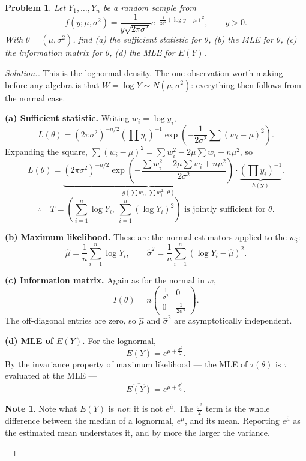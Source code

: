 \documentclass[12pt,a4paper]{report}
\theoremstyle{definition}
\newtheorem{note}[thm]{Note}
\theoremstyle{plain}
\newtheorem{problemx}{Problem}[section]
\newenvironment{problem}{\begin{problemx}}{\end{problemx}}
\newenvironment{solution}
  {\renewcommand{\qedsymbol}{}\begin{proof}[\textit{Solution}.]}
  {\end{proof}}
\begin{document}
\begin{problem}
Let $Y_1,\ldots,Y_n$ be a random sample from
\[f(y;\mu,\sigma^2)=\frac{1}{y\sqrt{2\pi\sigma^2}}
e^{-\frac{1}{2\sigma^2}(\log y-\mu)^2},\qquad y>0.\]
With $\theta=(\mu,\sigma^2)$, find (a) the sufficient statistic for $\theta$, (b) the
MLE for $\theta$, (c) the information matrix for $\theta$, (d) the MLE for $E(Y)$.
\end{problem}

\begin{solution}
This is the lognormal density. The one observation worth making before any algebra
is that $W=\log Y\sim N(\mu,\sigma^2)$: everything then follows from the normal case.

\textbf{(a) Sufficient statistic.} Writing $w_i=\log y_i$,
\[L(\theta)=\left(2\pi\sigma^2\right)^{-n/2}\left(\prod y_i\right)^{-1}
\exp\!\left(-\frac{1}{2\sigma^2}\sum(w_i-\mu)^2\right).\]
Expanding the square, $\sum(w_i-\mu)^2=\sum w_i^2-2\mu\sum w_i+n\mu^2$, so
\[L(\theta)=\underbrace{\left(2\pi\sigma^2\right)^{-n/2}
\exp\!\left(-\frac{\sum w_i^2-2\mu\sum w_i+n\mu^2}{2\sigma^2}\right)}
_{g\left(\sum w_i,\ \sum w_i^2;\ \theta\right)}
\cdot\underbrace{\left(\prod y_i\right)^{-1}}_{h(\mathbf{y})}.\]
\[\therefore\quad T=\left(\sum_{i=1}^n\log Y_i,\ \sum_{i=1}^n(\log Y_i)^2\right)
\text{ is jointly sufficient for }\theta.\]

\textbf{(b) Maximum likelihood.} These are the normal estimators applied to the
$w_i$:
\[\hat\mu=\frac{1}{n}\sum_{i=1}^n\log Y_i,\qquad
\hat\sigma^2=\frac{1}{n}\sum_{i=1}^n\left(\log Y_i-\hat\mu\right)^2.\]

\textbf{(c) Information matrix.} Again as for the normal in $w$,
\[I(\theta)=n\begin{pmatrix}\frac{1}{\sigma^2} & 0\\[3pt]
0 & \frac{1}{2\sigma^4}\end{pmatrix}.\]
The off-diagonal entries are zero, so $\hat\mu$ and $\hat\sigma^2$ are
asymptotically independent.

\textbf{(d) MLE of $E(Y)$.} For the lognormal,
\[E(Y)=e^{\mu+\frac{\sigma^2}{2}}.\]
By the invariance property of maximum likelihood --- the MLE of $\tau(\theta)$ is
$\tau$ evaluated at the MLE ---
\[\widehat{E(Y)}=e^{\hat\mu+\frac{\hat\sigma^2}{2}}.\]

\begin{note}
Note what $E(Y)$ is \emph{not}: it is not $e^{\hat\mu}$. The $\frac{\sigma^2}{2}$
term is the whole difference between the median of a lognormal, $e^{\mu}$, and its
mean. Reporting $e^{\hat\mu}$ as the estimated mean understates it, and by more the
larger the variance.
\end{note}
\end{solution}
\end{document}
